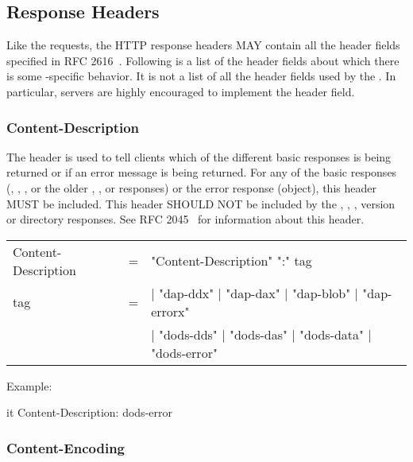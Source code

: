 \documentclass[justify]{dods-paper}
\begin{document}

\subsection{Response Headers}
\label{sec-resp-headers}

Like the requests, the HTTP response headers MAY contain all the
header fields specified in RFC 2616~\cite{rfc2616}.  Following is a
list of the header fields about which there is some \DAP{}-specific
behavior.  It is not a list of all the header fields used by the
\DAP.  In particular, servers are highly encouraged to implement the
 header field.

\subsubsection{Content-Description}

The  header is used to tell clients which of
the different basic responses is being returned or if an error message
is being returned. For any of the basic responses (\DDX, \DAX, \Blob,
or the older \DDS, \DAS, or \DataDDS responses) or the error response
(\ErrorX object), this header MUST be included. This header SHOULD NOT
be included by the \TEXT, \HTML, \INFO, version or directory responses.
See RFC 2045~\cite{rfc2045} for information about this header.

\begin{ttfamily}
\begin{center}
\begin{tabular}{lll}
Content-Description & = & "Content-Description" ":" tag \\
tag & = & | "dap-ddx" | "dap-dax" | "dap-blob" | "dap-errorx" \\
 & & | "dods-dds" | "dods-das" | "dods-data" | "dods-error" \\
\end{tabular}
\end{center}
\end{ttfamily}

Example:

\begin{vcode}{it}
Content-Description: dods-error
\end{vcode}

\subsubsection{Content-Encoding}
\end{document}
